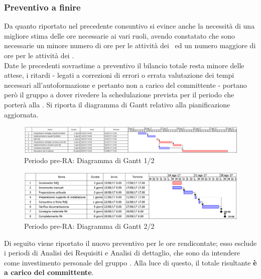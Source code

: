 \documentclass[../PianoDiProgetto.tex]{subfiles}
\begin{document}
	\subsubsection{Preventivo a finire}
	Da quanto riportato nel precedente consuntivo si evince anche la necessità di una migliore stima delle ore necessarie ai vari ruoli, avendo constatato che sono necessarie un minore numero di ore per le attività dei \progettisti\ ed un numero maggiore di ore per le attività dei \programmatori. \\ 
	Date le precedenti sovrastime a preventivo il bilancio totale resta minore delle attese, i ritardi - legati a correzioni di errori o errata valutazione dei tempi necessari all'autoformazione e pertanto non a carico del committente - portano però il gruppo a dover rivedere la schedulazione prevista per il periodo che porterà alla \revisionediaccettazione. Si riporta il diagramma di Gantt relativo alla pianificazione aggiornata. \\
	\begin{figure}[H]
		\centering
		\includegraphics[scale=0.37]{Figures/RQtoRA1}
		\caption{Periodo pre-RA: Diagramma di Gantt 1/2}
	\end{figure}
	\begin{figure}[H]
		\centering
		\includegraphics[scale=0.37]{Figures/RQtoRA2}
		\caption{Periodo pre-RA: Diagramma di Gantt 2/2}
	\end{figure}

	Di seguito viene riportato il nuovo preventivo per le ore rendicontate; esso esclude i periodi di Analisi dei Requisiti e Analisi di dettaglio, che sono da intendere come investimento personale del gruppo \kaleidoscode. Alla luce di questo, il totale risultante \textbf{è a carico del committente}.
	
\end{document}
